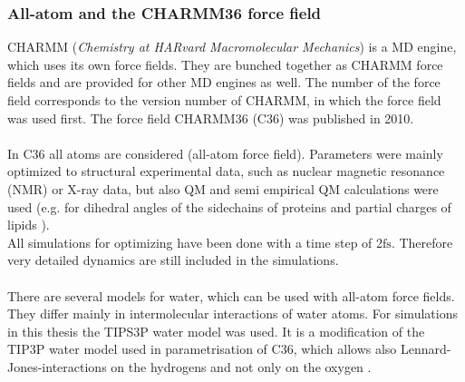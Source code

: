 \subsubsection{All-atom and the CHARMM36 force field}
CHARMM (\textit{Chemistry at HARvard Macromolecular Mechanics}) is a MD engine, which uses its own force fields. They are bunched together as CHARMM force fields and are provided for other MD engines as well. The number of the force field corresponds to the version number of CHARMM, in which the force field was used first. The force field CHARMM36 \autocites{charmm36_protein}{charmm36_lipids} (C36) was published in 2010.\\
\\
In C36 all atoms are considered (all-atom force field). Parameters were mainly optimized to structural experimental data, such as nuclear magnetic resonance (NMR) or X-ray data, but also QM and semi empirical QM calculations were used (e.g. for dihedral angles of the sidechains of proteins \autocite{charmm36_protein} and partial charges of lipids \autocite{charmm36_lipids}).\\
All simulations for optimizing have been done with a time step of 2$\si{\femto\second}$. Therefore very detailed dynamics are still included in the simulations.\\
\\
There are several models for water, which can be used with all-atom force fields. They differ mainly in intermolecular interactions of water atoms. For simulations in this thesis the TIPS3P water model was used. It is a modification of the TIP3P water model \autocite{tip3p} used in parametrisation of C36, which allows also Lennard-Jones-interactions on the hydrogens and not only on the oxygen \autocite{charmm36_protein}. %
